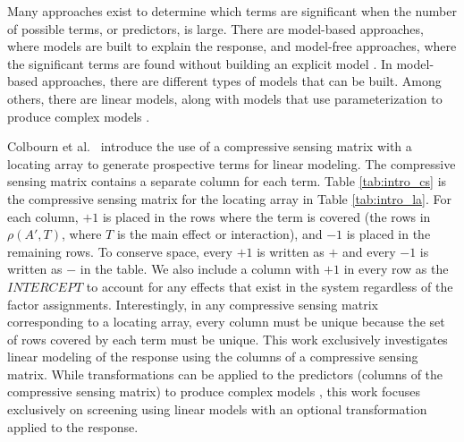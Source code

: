 Many approaches exist to determine which terms are significant when the number of possible terms, or predictors, is large.
There are model-based approaches, where models are built to explain the response, and model-free approaches, where the significant terms are found without building an explicit model \cite{SIS}.
In model-based approaches, there are different types of models that can be built.
Among others, there are linear models, along with models that use parameterization to produce complex models \cite{SIS}.

Colbourn et al.\ \cite{Compton-et-al-LA} introduce the use of a compressive sensing matrix with a locating array to generate prospective terms for linear modeling.
The compressive sensing matrix contains a separate column for each term.
Table \ref{tab:intro_cs} is the compressive sensing matrix for the locating array in Table \ref{tab:intro_la}.
For each column, $+1$ is placed in the rows where the term is covered (the rows in $\rho(A',T)$, where $T$ is the main effect or interaction), and $-1$ is placed in the remaining rows.
To conserve space, every $+1$ is written as $+$ and every $-1$ is written as $-$ in the table.
We also include a column with $+1$ in every row as the $\mathit{INTERCEPT}$ to account for any effects that exist in the system regardless of the factor assignments.
Interestingly, in any compressive sensing matrix corresponding to a locating array, every column must be unique because the set of rows covered by each term must be unique.
This work exclusively investigates linear modeling of the response using the columns of a compressive sensing matrix.
While transformations can be applied to the predictors (columns of the compressive sensing matrix) to produce complex models \cite{SIS}, this work focuses exclusively on screening using linear models with an optional transformation applied to the response.

